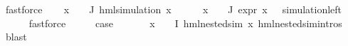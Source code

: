 \begin{isabellebody}
\ fastforce\isanewline
\ \ \isamarkupfalse%
\ {\isachardoublequoteopen}{\isasymforall}x\ {\isasymin}\ {\isasymPhi}\ {\isacharbackquote}{\kern0pt}\ J{\isachardot}{\kern0pt}\ hml{\isacharunderscore}{\kern0pt}simulation\ x{\isachardoublequoteclose}\isanewline
\ \ \ \ \isamarkupfalse%
\ {\isacartoucheopen}{\isasymforall}x\ {\isasymin}\ {\isasymPhi}\ {\isacharbackquote}{\kern0pt}\ J{\isachardot}{\kern0pt}\ expr{\isacharunderscore}{\kern0pt}{}\ x\ {\isasymle}\ {}{\isacartoucheclose}\ simulation{\isacharunderscore}{\kern0pt}left\ \isanewline
\ \ \ \ \isamarkupfalse%
\ fastforce\isanewline
\ \ \isamarkupfalse%
\ \isamarkupfalse%
\ {\isacharquery}{\kern0pt}case\ \isanewline
\ \ \ \ \isamarkupfalse%
\ {\isacartoucheopen}{\isasymforall}x\ {\isasymin}\ {\isasymPhi}\ {\isacharbackquote}{\kern0pt}\ I{\isachardot}{\kern0pt}\ hml{\isacharunderscore}{\kern0pt}{}{\isacharunderscore}{\kern0pt}nested{\isacharunderscore}{\kern0pt}sim\ x{\isacartoucheclose}\ hml{\isacharunderscore}{\kern0pt}{}{\isacharunderscore}{\kern0pt}nested{\isacharunderscore}{\kern0pt}sim{\isachardot}{\kern0pt}intros{\isacharparenleft}{\kern0pt}{}{\isacharparenright}{\kern0pt}\ \isamarkupfalse%
\ blast\isanewline
{}\isamarkupfalse%
%
\endisatagproof
{\isafoldproof}%
%
\isadelimproof
\isanewline
%
\endisadelimproof
%
\isadelimtheory
\isanewline
%
\endisadelimtheory
%
\isatagtheory
{}\isamarkupfalse%
%
\endisatagtheory
{\isafoldtheory}%
%
\isadelimtheory
%
\endisadelimtheory
%
\end{isabellebody}%
\endinput
